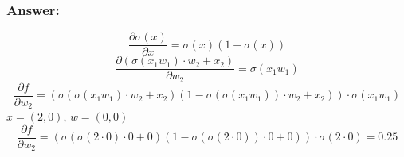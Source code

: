 \documentclass{article}
\begin{document}
\subsubsection*{Answer:}
\begin{equation*}
    \frac{\partial\sigma(x)}{\partial x} = \sigma(x)(1-\sigma(x))
\end{equation*}
\begin{equation*}
    \frac{\partial(\sigma(x_1w_1)\cdot w_2 + x_2)}{\partial w_2} = \sigma(x_1w_1)
\end{equation*}
\begin{equation*}
    \frac{\partial f}{\partial w_2} = (\sigma(\sigma(x_1w_1)\cdot w_2 + x_2)(1-\sigma(\sigma(x_1w_1))\cdot w_2 + x_2))\cdot\sigma(x_1w_1)
\end{equation*}
$x = (2,0)$, $w = (0,0)$
\begin{equation*}
    \frac{\partial f}{\partial w_2} = (\sigma(\sigma(2\cdot0)\cdot0 + 0)(1-\sigma(\sigma(2\cdot0))\cdot0 + 0))\cdot\sigma(2\cdot0) = 0.25
\end{equation*}
\end{document}
